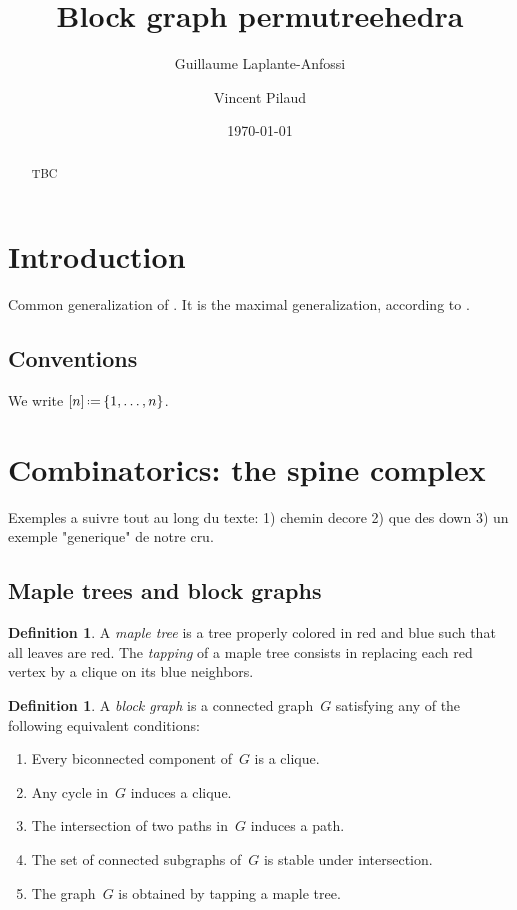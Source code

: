 \documentclass{amsart}
\title{Block graph permutreehedra}
\author{Guillaume Laplante-Anfossi}
\author{Vincent Pilaud}
\date{\today}
\theoremstyle{definition}
\newtheorem{definition}[theorem]{Definition}
\newcommand{\eqdef}{\mbox{\,\raisebox{0.2ex}{\scriptsize\ensuremath{\mathrm:}}\ensuremath{=}\,}} %
\newcommand{\darkblue}{\color{darkblue}} %
\newcommand{\defn}[1]{\textsl{\darkblue #1}} %
\begin{document}
\begin{abstract}
TBC
\end{abstract}

\maketitle


\section*{Introduction}

Common generalization of \cite{PilaudSignedTree13,LangePilaud13,PonsPilaud18,LA21}.
It is the maximal generalization, according to \cite{Pilaud14}.

\subsection*{Conventions} We write $[n] \eqdef \{1,\ldots,n\}$.


\section{Combinatorics: the spine complex}

Exemples a suivre tout au long du texte: 1) chemin decore 2) que des down 3) un exemple "generique" de notre cru.


\subsection{Maple trees and block graphs}

\begin{definition}
  A \defn{maple tree} is a tree properly colored in red and blue such that all leaves are red.
  The \defn{tapping} of a maple tree consists in replacing each red vertex by a clique on its blue neighbors.
\end{definition}

\begin{definition}
  \label{def:blockgraph}
  A \defn{block graph} is a connected graph~$G$ satisfying any of the following equivalent conditions:
  \begin{enumerate}
    \item Every biconnected component of~$G$ is a clique.
    \item Any cycle in~$G$ induces a clique.
    \item The intersection of two paths in~$G$ induces a path.
    \item The set of connected subgraphs of~$G$ is stable under intersection.
    \item The graph~$G$ is obtained by tapping a maple tree.
  \end{enumerate}
\end{definition}
\end{document}
